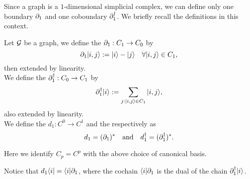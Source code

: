 \documentclass[../2.tex]{subfiles}
\begin{document}
    
    Since a graph is a $1$-dimensional simplicial complex, we can define only one boundary $\partial_1$ and one coboundary $\partial_1^\dagger$.
    We briefly recall the definitions in this context.

    \begin{defn}
        Let $\mathcal{G}$ be a graph, we define the  $\partial_1 : C_1 \to C_0$ by 
        \[ \partial_1| i,j \rangle := | i \rangle - | j \rangle \quad \forall | i,j \rangle \in C_1,\]
        then extended by linearity.\\
        We define the  $\partial^\dagger_1 : C_0 \to C_1$ by 
        \[ \partial^\dagger_1| i \rangle := \sum_{j : | i,j \rangle \in C_1} | i,j \rangle,\]
        also extended by linearity.\\
        We define the  $d_1 : C^0 \to C^1$ and the  respectively as
        \[ d_1 = (\partial_1)^* \quad \text{and} \quad d_1^\dagger = (\partial_1^\dagger)^* .\]
    \end{defn}

    Here we identify $C_p = C^p$ with the above choice of
    canonical basis.

    Notice that $d_1\langle i | = \langle i |\partial_1$,
    where the cochain $\langle i |\partial_1$ is the dual of the chain $\partial_1^\dagger| i \rangle$.





\end{document}
